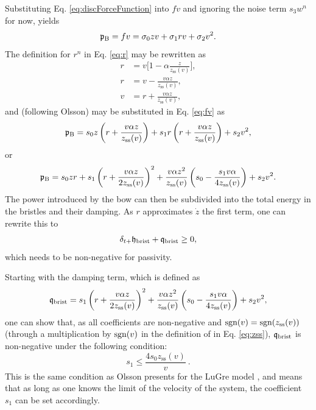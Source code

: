 Substituting Eq. \eqref{eq:discForceFunction} into $fv$ and ignoring the noise term $s_3w^n$ for now, yields
\begin{equation}\label{eq:fv}
    \mathfrak{p}_{\text{B}} = fv = \sigma_{0}zv +\sigma_{1}rv+\sigma_{2}v^2.
\end{equation}
The definition for $r^n$ in Eq. \eqref{eq:r} may be rewritten as
\begin{equation*}
    \begin{aligned}
        r &= v\bigg[1-\alpha\frac{z}{z_\text{ss}(v)}\bigg],\\
        r &= v-\frac{v\alpha z}{z_\text{ss}(v)},\\
        v &= r + \frac{v\alpha z}{z_\text{ss}(v)},
    \end{aligned}
\end{equation*}
and (following Olsson) may be substituted in Eq. \eqref{eq:fv} as
\begin{equation}
    \mathfrak{p}_{\text{B}} = s_{0}z\left(r+ \frac{v\alpha z}{z_\text{ss}(v)}\right)+s_{1}r\left(r+ \frac{v\alpha z}{z_\text{ss}(v)}\right)+s_{2}v^2,
\end{equation}
or
\begin{equation}
    \mathfrak{p}_{\text{B}} = s_0zr+s_1\left(r+\frac{v\alpha z}{2z_\text{ss}(v)}\right)^2+\frac{v\alpha z^2}{z_\text{ss}(v)}\left(s_0-\frac{s_1v\alpha}{4z_\text{ss}(v)}\right)+s_2v^2.
\end{equation}
The power introduced by the bow can then be subdivided into the total energy in the bristles and their damping. As $r$ approximates $\dot z$ the first term, one can rewrite this to 
\begin{equation*}
    \delta_{t+} \mathfrak{h}_\text{brist} + \mathfrak{q}_\text{brist} \geq 0,
\end{equation*}
which needs to be non-negative for passivity. 

Starting with the damping term, which is defined as
\begin{equation}
    \mathfrak{q}_\text{brist} = s_1\left(r+\frac{v\alpha z}{2z_\text{ss}(v)}\right)^2+\frac{v\alpha z^2}{z_\text{ss}(v)}\left(s_0-\frac{s_1v\alpha}{4z_\text{ss}(v)}\right)+s_2v^2,
\end{equation}
one can show that, as all coefficients are non-negative and $\text{sgn}(v) = \text{sgn}(z_\text{ss}(v))$ (through a multiplication by $\text{sgn}(v)$ in the definition of in Eq. \eqref{eq:zss}), $\mathfrak{q}_\text{brist}$ is non-negative under the following condition:
\begin{equation}
    s_1 \leq \frac{4s_0z_\text{ss}(v)}{v}\ .
\end{equation}
This is the same condition as Olsson presents for the LuGre model \cite{Olsson1996}, and means that as long as one knows the limit of the velocity of the system, the coefficient $s_1$ can be set accordingly.

